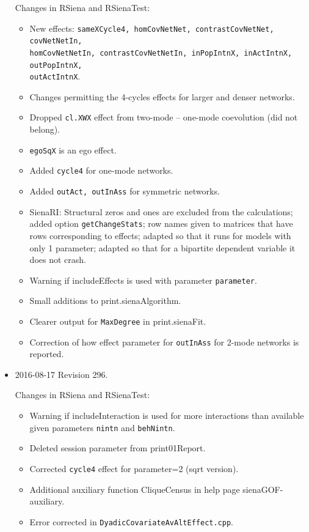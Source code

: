 \documentclass[a4paper,fleqn,11pt]{article}
\newcommand{\+}{\, + \,}
\newcommand{\sfn}[1]{\textsf{#1}}
\begin{document}
\begin{small}
\begin{itemize}
Changes in RSiena and RSienaTest:
\begin{itemize}
   \item New effects: \texttt{sameXCycle4, homCovNetNet, contrastCovNetNet,
     covNetNetIn, \\
     homCovNetNetIn, contrastCovNetNetIn, inPopIntnX, inActIntnX, outPopIntnX, \\
     outActIntnX}.
   \item Changes permitting the 4-cycles effects for larger and denser networks.
   \item Dropped \texttt{cl.XWX} effect from two-mode -- one-mode coevolution
     (did not belong).
   \item \texttt{egoSqX} is an ego effect.
   \item Added \texttt{cycle4} for one-mode networks.
   \item Added \texttt{outAct, outInAss} for symmetric networks.
   \item \sfn{SienaRI}: Structural zeros and ones are excluded from the calculations;
     added option \texttt{getChangeStats};
     row names given to matrices that have rows corresponding to effects;
     adapted so that it runs for models with only 1 parameter;
     adapted so that for a bipartite dependent variable it does not crash.
   \item Warning if \sfn{includeEffects} is used with parameter \texttt{parameter}.
   \item Small additions to \sfn{print.sienaAlgorithm}.
   \item Clearer output for \texttt{MaxDegree} in \sfn{print.sienaFit}.
   \item Correction of how effect parameter for \texttt{outInAss}
     for 2-mode networks is reported.
\end{itemize}


\item 2016-08-17 Revision 296.

Changes in RSiena and RSienaTest:
\begin{itemize}
   \item Warning if \sfn{includeInteraction} is used for more interactions
     than available given parameters \texttt{nintn} and \texttt{behNintn}.
   \item Deleted session parameter from \sfn{print01Report}.
   \item Corrected \texttt{cycle4} effect for parameter=2 (sqrt version).
   \item Additional auxiliary function \sfn{CliqueCensus} in help page \sfn{sienaGOF-auxiliary}.
   \item Error corrected in \texttt{DyadicCovariateAvAltEffect.cpp}.
\end{itemize}



\end{itemize}
\end{small}
\end{document}
